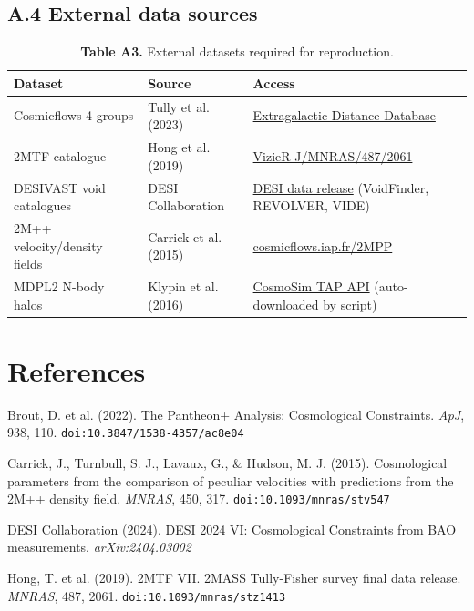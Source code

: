 \documentclass[11pt,a4paper]{article}
\begin{document}
\subsection{A.4 External data sources}
\begin{table}[H]
\centering
\footnotesize
\caption{\textbf{Table A3.} External datasets required for reproduction.}
\begin{tabularx}{\linewidth}{l>{\RaggedRight\arraybackslash}X>{\RaggedRight\arraybackslash}X}
\toprule
\textbf{Dataset} & \textbf{Source} & \textbf{Access} \tabularnewline
\midrule
Cosmicflows-4 groups & Tully et al. (2023) & \href{https://edd.ifa.hawaii.edu/CF4groupsHD/}{Extragalactic Distance Database} \tabularnewline
2MTF catalogue & Hong et al. (2019) & \href{https://vizier.cds.unistra.fr/viz-bin/VizieR-3?-source=J/MNRAS/487/2061}{VizieR J/\allowbreak{}MNRAS/\allowbreak{}487/\allowbreak{}2061} \tabularnewline
DESIVAST void catalogues & DESI Collaboration & \href{https://data.desi.lbl.gov/public/papers/c3/void\_catalog\_dr1/v1/}{DESI data release} (VoidFinder, REVOLVER, VIDE) \tabularnewline
2M++ velocity/\allowbreak{}density fields & Carrick et al. (2015) & \href{https://cosmicflows.iap.fr/2MPP/}{cosmicflows.iap.fr/\allowbreak{}2MPP} \tabularnewline
MDPL2 N-body halos & Klypin et al. (2016) & \href{https://www.cosmosim.org/}{CosmoSim TAP API} (auto-downloaded by script) \tabularnewline
\bottomrule
\end{tabularx}
\end{table}

\section{References}
\label{sec:sec11}
Brout, D. et al. (2022). The Pantheon+ Analysis: Cosmological Constraints. \emph{ApJ}, 938, 110. \texttt{doi:10.3847/\allowbreak{}1538-4357/\allowbreak{}ac8e04}

Carrick, J., Turnbull, S. J., Lavaux, G., \& Hudson, M. J. (2015). Cosmological parameters from the comparison of peculiar velocities with predictions from the 2M++ density field. \emph{MNRAS}, 450, 317. \texttt{doi:10.1093/\allowbreak{}mnras/\allowbreak{}stv547}

DESI Collaboration (2024). DESI 2024 VI: Cosmological Constraints from BAO measurements. \emph{arXiv:2404.03002}

Hong, T. et al. (2019). 2MTF VII. 2MASS Tully-Fisher survey final data release. \emph{MNRAS}, 487, 2061. \texttt{doi:10.1093/\allowbreak{}mnras/\allowbreak{}stz1413}
\end{document}
